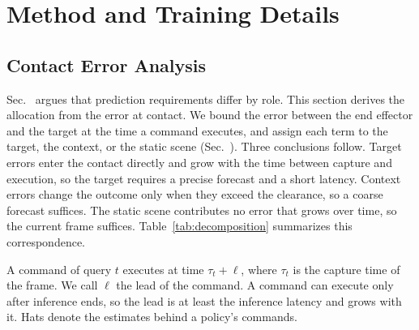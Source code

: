 \section{Method and Training Details}
\label{app:implementation}

\subsection{Contact Error Analysis}
\label{app:decomposition}
Sec.~ argues that prediction requirements differ by role.
This section derives the allocation from the error at contact. We bound the error
between the end effector and the target at the time a command executes, and assign
each term to the target, the context, or the static scene
(Sec.~). Three conclusions follow. Target errors enter the
contact directly and grow with the time between capture and execution, so the target
requires a precise forecast and a short latency. Context errors change the outcome only
when they exceed the clearance, so a coarse forecast suffices. The static scene
contributes no error that grows over time, so the current frame suffices.
Table~\ref{tab:decomposition} summarizes this correspondence.


A command of query $t$ executes at time $\tau_t+\ell$, where $\tau_t$ is the capture
time of the frame. We call $\ell$ the lead of the command. A command can execute only
after inference ends, so the lead is at least the inference latency and grows with it.
Hats denote the estimates behind a policy's commands.

